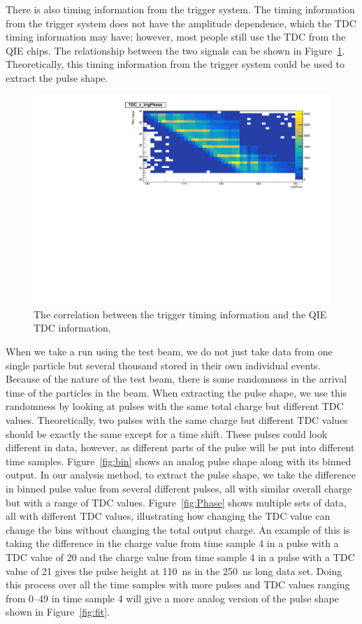 There is also timing information from the trigger system. The timing information from the trigger system does not have the amplitude dependence, which the TDC timing information may have; however, most people still use the TDC from the QIE chips. The relationship between the two signals can be shown in Figure~\ref{fig:tdc}. Theoretically, this timing information from the trigger system could be used to extract the pulse shape.

\begin{figure}
\centering
\includegraphics[width=\linewidth]{Figures/TDCvTrigPhase.pdf}
\caption{The correlation between the trigger timing information and the QIE TDC information.}
\label{fig:tdc}
\end{figure}

When we take a run using the test beam, we do not just take data from one single particle but several thousand stored in their own individual events. Because of the nature of the test beam, there is some randomness in the arrival time of the particles in the beam. When extracting the pulse shape, we use this randomness by looking at pulses with the same total charge but different TDC values. Theoretically, two pulses with the same charge but different TDC values should be exactly the same except for a time shift. These pulses could look different in data, however, as different parts of the pulse will be put into different time samples. Figure~\ref{fig:bin} shows an analog pulse shape along with its binned output. In our analysis method, to extract the pulse shape, we take the difference in binned pulse value from several different pulses, all with similar overall charge but with a range of TDC values. Figure~\ref{fig:Phase} shows multiple sets of data, all with different TDC values, illustrating how changing the TDC value can change the bins without changing the total output charge. An example of this is taking the difference in the charge value from time sample 4 in a pulse with a TDC value of 20 and the charge value from time sample 4 in a pulse with a TDC value of 21 gives the pulse height at 110~ns in the 250~ns long data set. Doing this process over all the time samples with more pulses and TDC values ranging from 0--49 in time sample 4 will give a more analog version of the pulse shape shown in Figure~\ref{fig:fit}.

